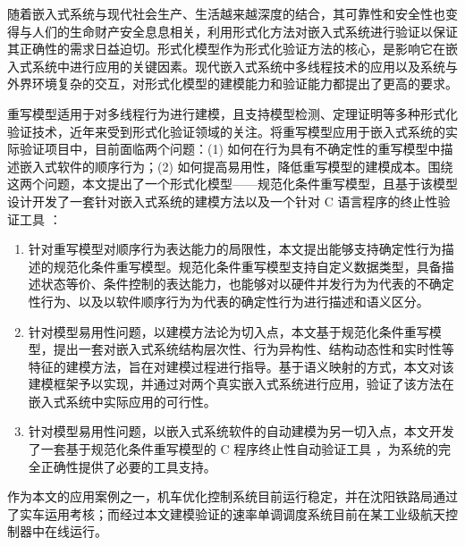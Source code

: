\begin{cabstract}
随着嵌入式系统与现代社会生产、生活越来越深度的结合，其可靠性和安全性也变得与人们的生命财产安全息息相关，利用形式化方法对嵌入式系统进行验证以保证其正确性的需求日益迫切。形式化模型作为形式化验证方法的核心，是影响它在嵌入式系统中进行应用的关键因素。现代嵌入式系统中多线程技术的应用以及系统与外界环境复杂的交互，对形式化模型的建模能力和验证能力都提出了更高的要求。

重写模型适用于对多线程行为进行建模，且支持模型检测、定理证明等多种形式化验证技术，近年来受到形式化验证领域的关注。将重写模型应用于嵌入式系统的实际验证项目中，目前面临两个问题：(1) 如何在行为具有不确定性的重写模型中描述嵌入式软件的顺序行为；(2) 如何提高易用性，降低重写模型的建模成本。围绕这两个问题，本文提出了一个形式化模型——规范化条件重写模型，且基于该模型设计开发了一套针对嵌入式系统的建模方法以及一个针对 C 语言程序的终止性验证工具 \CTerm：

\begin{enumerate}
\item
针对重写模型对顺序行为表达能力的局限性，本文提出能够支持确定性行为描述的规范化条件重写模型。规范化条件重写模型支持自定义数据类型，具备描述状态等价、条件控制的表达能力，也能够对以硬件并发行为为代表的不确定性行为、以及以软件顺序行为为代表的确定性行为进行描述和语义区分。
\item
针对模型易用性问题，以建模方法论为切入点，本文基于规范化条件重写模型，提出一套对嵌入式系统结构层次性、行为异构性、结构动态性和实时性等特征的建模方法，旨在对建模过程进行指导。基于语义映射的方式，本文对该建模框架予以实现，并通过对两个真实嵌入式系统进行应用，验证了该方法在嵌入式系统中实际应用的可行性。
\item 
针对模型易用性问题，以嵌入式系统软件的自动建模为另一切入点，本文开发了一套基于规范化条件重写模型的 C 程序终止性自动验证工具 \CTerm，为系统的完全正确性提供了必要的工具支持。
\end{enumerate}

作为本文的应用案例之一，机车优化控制系统目前运行稳定，并在沈阳铁路局通过了实车运用考核；而经过本文建模验证的速率单调调度系统目前在某工业级航天控制器中在线运行。
\end{cabstract}


